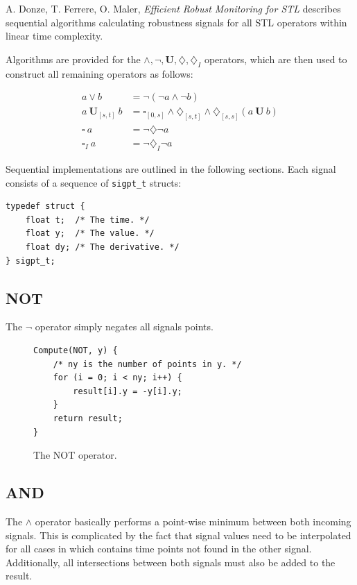 \documentclass[a4paper,10pt]{article}
\renewcommand{\And}{\wedge}
\newcommand{\Or}{\vee}
\newcommand{\Neg}{\neg}
\newcommand{\Until}{\mathbf{U}}
\newcommand{\Evtl}{\diamondsuit}
\newcommand{\Alw}{\square}
\newcommand{\Bevtl}{\diamondsuit_I}
\newcommand{\Balw}{\square_I}
\begin{document}
A. Donze, T. Ferrere, O. Maler, \emph{Efficient Robust Monitoring for STL} describes
sequential algorithms calculating robustness signals for all STL operators within linear
time complexity.

Algorithms are provided for the $\And, \Neg, \Until, \Evtl, \Bevtl$ operators, which are then used
to construct all remaining operators as follows:

\begin{align}
a \Or b &= \Neg (\Neg a \And \Neg b) \\
a \: \Until_{[s, t]} \: b &= \Alw_{[0, s]} \And \Evtl_{[s, t]} \And \Evtl_{[s, s]} (a \: \Until \: b)\\
\Alw \:  a &= \Neg \Evtl  \Neg a \\
\Balw \: a &= \Neg \Bevtl \Neg a
\end{align}

Sequential implementations are outlined in the following sections. Each signal consists
of a sequence of \lstinline|sigpt_t| structs:

\begin{lstlisting}
typedef struct {
    float t;  /* The time. */
    float y;  /* The value. */
    float dy; /* The derivative. */
} sigpt_t;
\end{lstlisting}

\subsection{NOT}

The $\Neg$ operator simply negates all signals points.

\begin{figure}[H]
\begin{lstlisting}
Compute(NOT, y) {
    /* ny is the number of points in y. */
    for (i = 0; i < ny; i++) {
        result[i].y = -y[i].y;
    }
    return result;
}
\end{lstlisting}
\label{fig:not}
\caption{The NOT operator.}
\end{figure}

\subsection{AND}

The $\And$ operator basically performs a point-wise minimum between both incoming signals.
This is complicated by the fact that signal values need to be interpolated for all
cases in which contains time points not found in the other signal. Additionally,
all intersections between both signals must also be added to the result.
\end{document}
